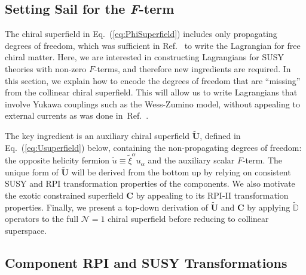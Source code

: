 \documentclass[12pt,document,nofootinbib,superscriptaddress,onecolumn,preprintnumbers,balancelastpage]{article}
\DeclareRobustCommand{\Eq}[1]{Eq.~(\ref{#1})}
\DeclareRobustCommand{\Ref}[1]{Ref.~\cite{#1}}
\newcommand{\bC}{ \boldsymbol C}
\newcommand{\bU}{ \tilde{\boldsymbol U}}
\newcommand{\D}{\mathbb{D}}
\newcommand{\uu}{\tilde u}
\begin{document}
\begin{spacing}{1.2}
\section{Setting Sail for the \emph{F}-term}
\label{sec:Fterm}


The chiral superfield in \Eq{eq:PhiSuperfield} includes only propagating degrees of freedom, which was sufficient in \Ref{Cohen:2018qvn} to write the Lagrangian for free chiral matter.
%
Here, we are interested in constructing Lagrangians for SUSY theories with non-zero $F$-terms, and therefore new ingredients are required.
%
In this section, we explain how to encode the degrees of freedom that are ``missing'' from the collinear chiral superfield.
%
This will allow us to write Lagrangians that involve Yukawa couplings such as the Wess-Zumino model, without appealing to external currents as was done in~\Ref{Cohen:2016dcl}.


The key ingredient is an auxiliary chiral superfield $\bU$, defined in \Eq{eq:Usuperfield} below, containing the non-propagating degrees of freedom:  the opposite helicity fermion $\uu \equiv \tilde{\xi}^\alpha u_\alpha$ and the auxiliary scalar $F$-term.
%
The unique form of $\bU$ will be derived from the bottom up by relying on consistent SUSY and RPI transformation properties of the components.
%
We also motivate the exotic constrained superfield $\bC$ by appealing to its RPI-II transformation properties.
%
Finally, we present a top-down derivation of $\bU$ and $\bC$ by applying $\tilde{\D}$ operators to the full $\mathcal{N}=1$ chiral superfield before reducing to collinear superspace.



\subsection{Component RPI and SUSY Transformations}
\label{subsec:RPIuanduu}


\end{spacing}
\end{document}
